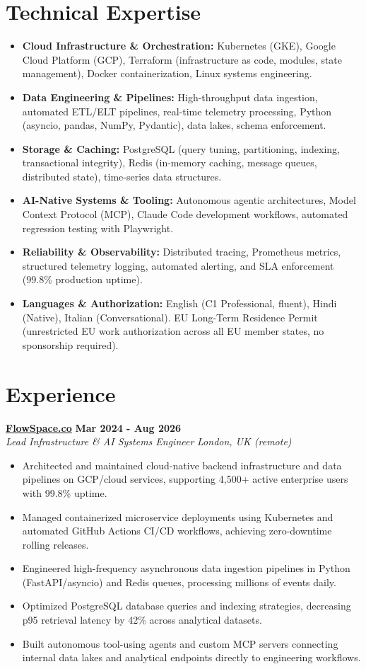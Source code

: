 \documentclass[10pt,a4paper]{article}
\newcommand{\role}[4]{%
  \textbf{#1} \hfill \textbf{#2}\\[1pt]%
  \textit{#3} \hfill \textit{#4}\\[2pt]%
}
\begin{document}
\section{Technical Expertise}
\begin{itemize}
  \item \textbf{Cloud Infrastructure \& Orchestration:} Kubernetes (GKE), Google Cloud Platform (GCP), Terraform (infrastructure as code, modules, state management), Docker containerization, Linux systems engineering.
  \item \textbf{Data Engineering \& Pipelines:} High-throughput data ingestion, automated ETL/ELT pipelines, real-time telemetry processing, Python (asyncio, pandas, NumPy, Pydantic), data lakes, schema enforcement.
  \item \textbf{Storage \& Caching:} PostgreSQL (query tuning, partitioning, indexing, transactional integrity), Redis (in-memory caching, message queues, distributed state), time-series data structures.
  \item \textbf{AI-Native Systems \& Tooling:} Autonomous agentic architectures, Model Context Protocol (MCP), Claude Code development workflows, automated regression testing with Playwright.
  \item \textbf{Reliability \& Observability:} Distributed tracing, Prometheus metrics, structured telemetry logging, automated alerting, and SLA enforcement (99.8\% production uptime).
  \item \textbf{Languages \& Authorization:} English (C1 Professional, fluent), Hindi (Native), Italian (Conversational). EU Long-Term Residence Permit (unrestricted EU work authorization across all EU member states, no sponsorship required).
\end{itemize}

\section{Experience}

\role{\href{https://flowspace.co}{FlowSpace.co}}{Mar 2024 - Aug 2026}{Lead Infrastructure \& AI Systems Engineer}{London, UK (remote)}
\begin{itemize}
  \item Architected and maintained cloud-native backend infrastructure and data pipelines on GCP/cloud services, supporting 4,500+ active enterprise users with 99.8\% uptime.
  \item Managed containerized microservice deployments using Kubernetes and automated GitHub Actions CI/CD workflows, achieving zero-downtime rolling releases.
  \item Engineered high-frequency asynchronous data ingestion pipelines in Python (FastAPI/asyncio) and Redis queues, processing millions of events daily.
  \item Optimized PostgreSQL database queries and indexing strategies, decreasing p95 retrieval latency by 42\% across analytical datasets.
  \item Built autonomous tool-using agents and custom MCP servers connecting internal data lakes and analytical endpoints directly to engineering workflows.
\end{itemize}
\end{document}
